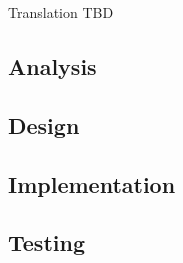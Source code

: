 \documentclass[../main.tex]{subfiles}
\begin{document}
Translation TBD

\subsection{Analysis}


\subsection{Design}


\subsection{Implementation}


\subsection{Testing}

\end{document}
